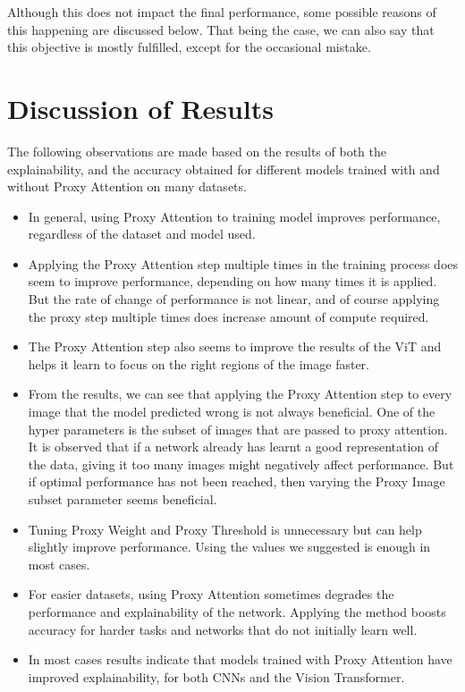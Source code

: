 \documentclass[a4paper,11pt,openright]{book}
\begin{document}
\begin{itemize}
Although this does not impact the final performance, some possible reasons of this happening are discussed below. That being the case, we can also say that this objective is mostly fulfilled, except for the occasional mistake.
\end{itemize}


\section{Discussion of Results}
The following observations are made based on the results of both the explainability, and the accuracy obtained for different models trained with and without Proxy Attention on many datasets.
\begin{itemize}
 \item In general, using Proxy Attention to training model improves performance, regardless of the dataset and model used.
 \item Applying the Proxy Attention step multiple times in the training process does seem to improve performance, depending on how many times it is applied. But the rate of change of performance is not linear, and of course applying the proxy step multiple times does increase amount of compute required.
 \item The Proxy Attention step also seems to improve the results of the ViT and helps it learn to focus on the right regions of the image faster.
 \item From the results, we can see that applying the Proxy Attention step to every image that the model predicted wrong is not always beneficial. One of the hyper parameters is the subset of images that are passed to proxy attention. It is observed that if a network already has learnt a good representation of the data, giving it too many images might negatively affect performance. But if optimal performance has not been reached, then varying the Proxy Image subset parameter seems beneficial.
 \item Tuning Proxy Weight and Proxy Threshold is unnecessary but can help slightly improve performance. Using the values we suggested is enough in most cases.
 \item For easier datasets, using Proxy Attention sometimes degrades the performance and explainability of the network. Applying the method boosts accuracy for harder tasks and networks that do not initially learn well.
 \item In most cases results indicate that models trained with Proxy Attention have improved explainability, for both CNNs and the Vision Transformer.
\end{itemize}
\end{document}
